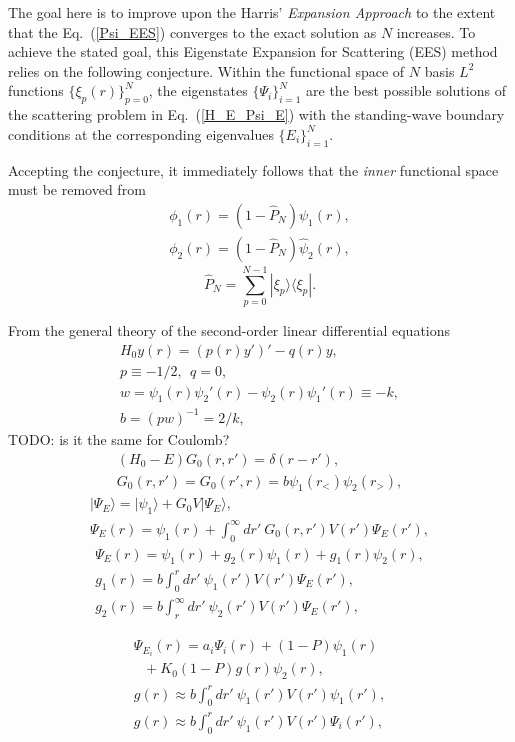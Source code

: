 \documentclass[aip
, pra
, showpacs
, aps
, twocolumn
, groupedaddress
, floatfix
]{revtex4}
\newcommand{\beq}{\begin{equation}}
\newcommand{\eeq}{\end{equation}}
\newcommand{\barr}{\begin{array}}
\newcommand{\earr}{\end{array}}
\begin{document}
The goal here is to improve upon the Harris' {\em Expansion Approach} \cite{Harris67} to the extent that the Eq.~(\ref{Psi_EES})
converges to the exact solution as $N$ increases.
To achieve the stated goal, this Eigenstate Expansion for Scattering (EES) method relies on the following conjecture.
Within the functional space of $N$ basis $L^2$ functions  $\{\xi_p(r)\}_{p=0}^N$,
the eigenstates $\{\Psi_i\}_{i=1}^{N}$ are the best possible solutions of the scattering problem in Eq.~(\ref{H_E_Psi_E})
with the standing-wave boundary conditions at the corresponding eigenvalues $\{E_i\}_{i=1}^{N}$.



Accepting the conjecture, it immediately follows that the {\em inner} functional space must be removed from
\beq \barr{l}
\phi_1(r) = (1-\hat{P}_N) \psi_1(r),\\
\phi_2(r) = (1-\hat{P}_N) \hat{\psi}_2(r),
\earr \eeq
\beq
\hat{P}_N = \sum_{p=0}^{N-1} | \xi_p \rangle \langle \xi_p |.
\eeq



From the general theory of the second-order linear differential equations
\beq \barr{l}
H_0 y(r) = (p(r) y')' - q(r) y,\\
p \equiv -1/2, \ \ q = 0,\\
w = \psi_1(r) \psi_2'(r) - \psi_2(r) \psi_1'(r) \equiv -k,\\
b = (pw)^{-1}= 2/k,
\earr \eeq
TODO: is it the same for Coulomb?
\beq \barr{l}
(H_0 - E) G_0(r,r') = \delta(r-r'),\\
G_0(r,r') = G_0(r',r) = b \psi_1(r_{<}) \psi_2(r_{>}),
\earr \eeq
\beq \barr{l}
| \Psi_E \rangle = | \psi_1 \rangle + G_0 V |\Psi_E \rangle,\\
\Psi_E(r) = \psi_1(r) +  \int_0^\infty dr'\ G_0(r,r') V(r') \Psi_E(r'),
\earr \eeq
\beq \barr{l}
\Psi_E(r) = \psi_1(r) +  g_2(r) \psi_1(r) + g_1(r) \psi_2(r),\\
g_1(r) = b \int_0^r dr'\ \psi_1(r') V(r') \Psi_E(r'), \\
g_2(r) = b \int_r^\infty dr'\ \psi_2(r') V(r') \Psi_E(r'),
\earr \eeq

\beq \barr{l}
\Psi_{E_i}(r) = a_i \Psi_i(r)  + (1-P)\psi_1(r)  \\
\ \ \ + K_0 (1-P)g(r)\psi_2(r),\\
g(r) \approx b \int_0^r dr'\ \psi_1(r') V(r') \psi_1(r'), \\
g(r) \approx b \int_0^r dr'\ \psi_1(r') V(r') \Psi_i(r'), \\
\earr \eeq
\end{document}
